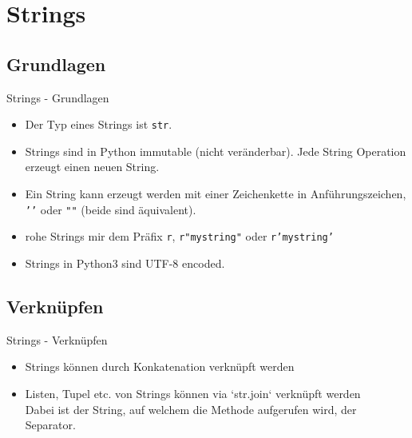 \section{Strings}
\subsection{Grundlagen}
\begin{frame}[fragile]{Strings - Grundlagen}
	\begin{itemize}
	    \item Der Typ eines Strings ist \alert{\texttt{str}}.
	    \item Strings sind in Python immutable (nicht veränderbar). Jede String Operation erzeugt einen neuen String.
	    \item Ein String kann erzeugt werden mit einer Zeichenkette in Anführungszeichen, \alert{\texttt{'{}'{}}} oder \alert{\texttt{"{}"{}}} (beide sind äquivalent).
	    \item rohe Strings mir dem Präfix \alert{\texttt{r}}, \alert{\texttt{r"mystring"}} oder \alert{\texttt{r'mystring'}}
	    \item Strings in Python3 sind UTF-8 encoded.
	\end{itemize}
\end{frame}


\subsection{Verknüpfen}
\begin{frame}[fragile]{Strings - Verknüpfen}
	\begin{itemize}
	    \item Strings können durch Konkatenation verknüpft werden \\
	    
	    \item Listen, Tupel etc. von Strings können via `str.join` verknüpft werden \\
	    
	    Dabei ist der String, auf welchem die Methode aufgerufen wird, der Separator.
	\end{itemize}
\end{frame}


